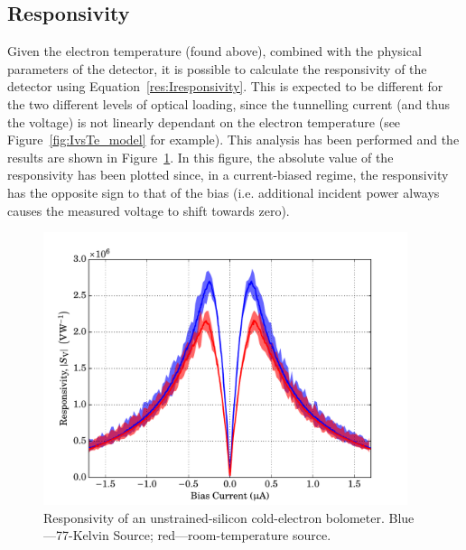\subsection{Responsivity}\label{ssec:opticalControlSi_responsivity}
Given the electron temperature (found above), combined with the physical parameters of the detector, it is possible to calculate the responsivity of the detector using Equation~\ref{res:Iresponsivity}. This is expected to be different for the two different levels of optical loading, since the tunnelling current (and thus the voltage) is not linearly dependant on the electron temperature (see Figure~\ref{fig:IvsTe_model} for example). This analysis has been performed and the results are shown in Figure~\ref{fig:controlResponsivity}. In this figure, the absolute value of the responsivity has been plotted since, in a current-biased regime, the responsivity has the opposite sign to that of the bias (i.e. additional incident power always causes the measured voltage to shift towards zero).
\begin{figure}[tb]
\begin{center}
\includegraphics[width = 0.95\textwidth]{figures/control_responsivity}
\caption[Responsivity of an unstrained-\gls{acr:SiCEB}]{Responsivity of an unstrained-silicon cold-electron bolometer. Blue---77-Kelvin Source; red---room-temperature source.}
\label{fig:controlResponsivity}
\end{center}
\end{figure}
\par 
